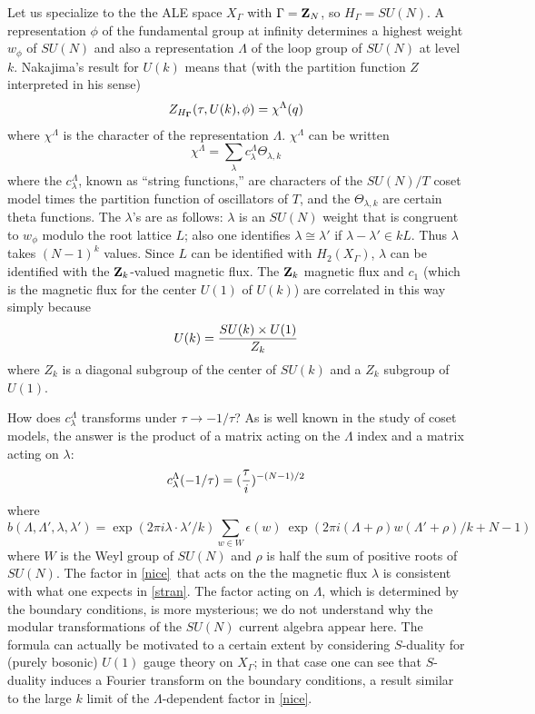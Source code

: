\documentclass[12pt]{article}
\numberwithin{equation}{section}
\begin{document}
Let us specialize to the
the ALE space $X_\Gamma$ with $\Gamma ={\bf Z}_N$, so $H_\Gamma=SU(N)$.
A representation $\phi$ of the fundamental group at infinity determines
a highest weight $w_\phi$ of $SU(N)$ and also a representation
$\Lambda$ of the loop group of $SU(N)$ at level $k$.
Nakajima's result for $U(k)$
means that (with the partition function $Z$ interpreted in his sense)
%
$$Z_{H_{\bf \Gamma}}(\tau,U(k),\phi )=\chi^{\Lambda }(q)$$
%
where $\chi^\Lambda$ is the character  of the representation $\Lambda$.
$\chi^\Lambda$ can be written
\cite{kacbook}
%
$$\chi^{\Lambda}=\sum_{\lambda}c^{\Lambda}_\lambda \Theta_{\lambda,k}$$
%
where the $c^{\Lambda}_\lambda $, known as ``string functions,''
are characters of the $SU(N)/T$ coset model times the partition
function of oscillators of $T$, and
the $\Theta_{\lambda,k}$ are certain theta functions.
The $\lambda$'s are as follows: $\lambda$ is an $SU(N)$ weight
that is congruent to $w_\phi$ modulo the root lattice $L$; also one
identifies $\lambda\cong \lambda'$ if $\lambda-\lambda'\in kL$.
Thus
$\lambda$ takes $(N-1)^k$ values.  Since $L$ can be identified
with $H_2(X_\Gamma)$, $\lambda$ can be identified with the ${\bf Z}_k$-valued
magnetic flux.
The ${\bf Z}_k$
magnetic flux and $c_1$ (which is the magnetic flux for the center
$U(1)$ of $U(k)$) are correlated in this way simply because
%
$$U(k)={SU(k)\times U(1)\over Z_k}$$
%
where $Z_k$ is a diagonal subgroup of the center of $SU(k)$ and a $Z_k$
subgroup of $U(1)$.

How does $c^\Lambda_\lambda$ transforms under
$\tau \rightarrow {-1/\tau}$?  As is well known in the
study of coset models, the answer is the product of a matrix acting
on the $\Lambda$ index and a matrix acting on $\lambda$:
%
\begin{equation}
  \label{strin}
  c^\Lambda_\lambda(-1/\tau)=({\tau \over i})^{-(N-1)/2}
\end{equation}
%
where
%
\begin{equation}
  \label{nice}
  b(\Lambda,\Lambda',\lambda,\lambda')
  =\exp(2\pi i \lambda \cdot \lambda' /k)\sum_{w\in W} \epsilon
  (w)\ \exp(2\pi i (\Lambda +\rho)w(\Lambda'+\rho)/k+N-1)
\end{equation}
%
where $W$ is the Weyl group of $SU(N)$ and $\rho$ is half the
sum of positive roots of $SU(N)$.  The factor in \eqref{nice}\
that acts on the the magnetic flux
$\lambda$  is consistent with what one expects in
\eqref{stran}.
The factor acting on $\Lambda$, which is determined by the boundary
conditions, is more mysterious;  we do not understand why
the modular transformations of the $SU(N)$ current algebra appear here.
The formula can actually be motivated to a certain extent by considering
$S$-duality for (purely bosonic) $U(1)$ gauge theory on $X_\Gamma$; in that
case one can see that $S$-duality induces a Fourier transform on the boundary
conditions, a result similar to the large
$k$ limit of the $\Lambda$-dependent factor in \eqref{nice}.
\end{document}
